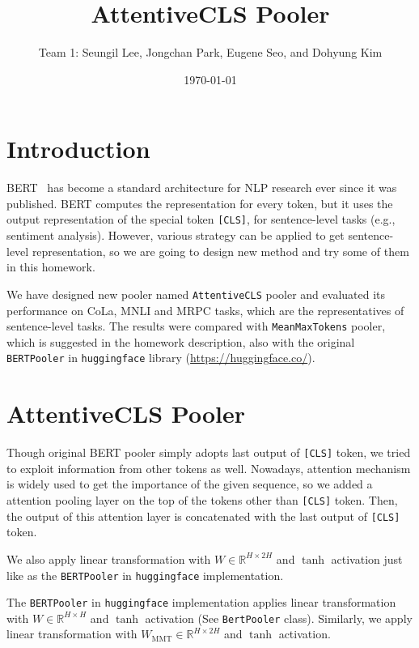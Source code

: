 \documentclass[UTF8]{article}
\title{AttentiveCLS Pooler}
\author{
  Team 1:  %
  Seungil Lee, Jongchan Park, Eugene Seo, and Dohyung Kim %
}
\date{\today}
\begin{document}
\maketitle

\section{Introduction}

BERT~\cite{devlin-etal-2019-bert} has become a standard architecture for NLP research ever since it was published. BERT computes the representation for every token, but it uses the output representation of the special token \texttt{[CLS]}, for sentence-level tasks (e.g., sentiment analysis). However, various strategy can be applied to get sentence-level representation, so we are going to design new method and try some of them in this homework.

We have designed new pooler named \texttt{AttentiveCLS} pooler and evaluated its performance on CoLa, MNLI and MRPC tasks, which are the representatives of sentence-level tasks. The results were compared with \texttt{MeanMaxTokens} pooler, which is suggested in the homework description, also with the original \texttt{BERTPooler} in \texttt{huggingface} library (\url{https://huggingface.co/}).

\section{AttentiveCLS Pooler}
Though original BERT pooler simply adopts last output of \texttt{[CLS]} token, we tried to exploit information from other tokens as well. Nowadays, attention mechanism is widely used to get the importance of the given sequence, so we added a attention pooling layer on the top of the tokens other than \texttt{[CLS]} token. Then, the output of this attention layer is concatenated with the last output of \texttt{[CLS]} token.

We also apply linear transformation with $W \in \mathbb{R}^{H \times 2H}$ and $\tanh$ activation just like as the \texttt{BERTPooler} in \texttt{huggingface} implementation.

The \texttt{BERTPooler} in \texttt{huggingface} implementation applies linear transformation with $W \in \mathbb{R}^{H \times H}$ and $\tanh$ activation (See \texttt{BertPooler} class). Similarly, we apply linear transformation with $W_{\text{MMT}} \in \mathbb{R}^{H \times 2H}$ and $\tanh$ activation.


\end{document}
